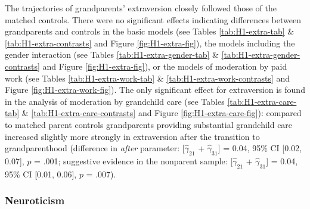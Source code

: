 \documentclass[
  english,
  man, noextraspace]{apa7}
\begin{document}
The trajectories of grandparents' extraversion closely followed those of the matched controls. There were no significant effects indicating differences between grandparents and controls in the basic models (see Tables \ref{tab:H1-extra-tab} \& \ref{tab:H1-extra-contrasts} and Figure \ref{fig:H1-extra-fig}), the models including the gender interaction (see Tables \ref{tab:H1-extra-gender-tab} \& \ref{tab:H1-extra-gender-contrasts} and Figure \ref{fig:H1-extra-fig}), or the models of moderation by paid work (see Tables \ref{tab:H1-extra-work-tab} \& \ref{tab:H1-extra-work-contrasts} and Figure \ref{fig:H1-extra-work-fig}). The only significant effect for extraversion is found in the analysis of moderation by grandchild care (see Tables \ref{tab:H1-extra-care-tab} \& \ref{tab:H1-extra-care-contrasts} and Figure \ref{fig:H1-extra-care-fig}): compared to matched parent controls grandparents providing substantial grandchild care increased slightly more strongly in extraversion after the transition to grandparenthood (difference in \emph{after} parameter: {[}\(\hat{\gamma}_{21}\) + \(\hat{\gamma}_{31}\){]} = 0.04, 95\% CI {[}0.02, 0.07{]}, \(p\) = .001; suggestive evidence in the nonparent sample: {[}\(\hat{\gamma}_{21}\) + \(\hat{\gamma}_{31}\){]} = 0.04, 95\% CI {[}0.01, 0.06{]}, \(p\) = .007).

\hypertarget{neuroticism}{%
\subsubsection{Neuroticism}\label{neuroticism}}
\end{document}
